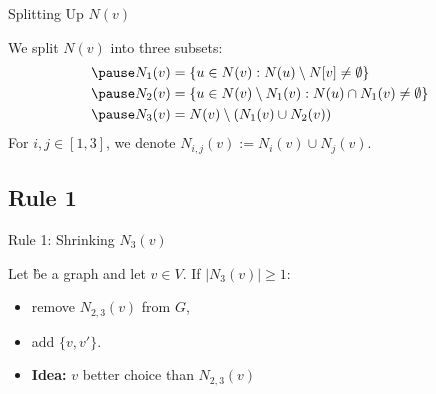 \begin{frame}[c]{Splitting Up $N(v)$}
    \begin{figure}[!ht]
    \end{figure}

 We split $N(v)$ into three subsets:
    \begin{align}
       \pause N_1(v) & = \{u \in N(v) : N(u) \setminus N[v] \neq \emptyset \}              \\
        \pause N_2(v) & = \{u \in N(v)\setminus N_1(v) : N(u) \cap N_1(v) \neq \emptyset \} \\
        \pause N_3(v) & = N(v) \setminus (N_1(v) \cup N_2(v))
    \end{align}
    For $i,j \in [1,3]$, we denote $N_{i,j} (v) := N_i(v) \cup N_j(v)$. 
\end{frame}


\subsection{Rule 1}
\begin{frame}[c]{Rule 1: Shrinking $N_3(v)$}

    \begin{tcolorbox}[colback=TUMBlueLighter,title=]
        Let \G be a graph and let $v \in V$. If $|N_3(v)| \geq 1$:
        \begin{itemize}
            \item remove $N_{2,3}(v)$ from $G$,
            \item add $\{v, v'\}$.
        \end{itemize}
    \end{tcolorbox}

    \begin{figure}[!ht]
    \end{figure}
    \begin{itemize}
        \item \textbf{Idea: } $v$ better choice than $N_{2,3}(v)$
    \end{itemize}
\end{frame}


